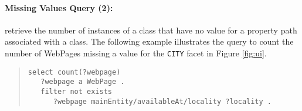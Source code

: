 \paragraph{Missing Values Query (2):} retrieve the number of instances of a class that have no value for a property path associated with a class.
The following example illustrates the query to count the number of WebPages missing a value for the \verb|CITY| facet in Figure \ref{fig:ui}.
\begin{quote}
{\footnotesize
\begin{verbatim}
select count(?webpage)
   ?webpage a WebPage .
   filter not exists
      ?webpage mainEntity/availableAt/locality ?locality .
\end{verbatim}}
\end{quote}